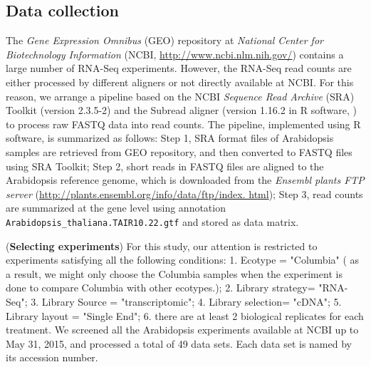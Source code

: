 \documentclass[11pt, a4paper]{article}
\begin{document}
\subsection{Data collection}\label{section:DataCollection}
The \textit{Gene Expression Omnibus} (GEO) repository at \textit{National Center for Biotechnology Information} (NCBI, \url{http://www.ncbi.nlm.nih.gov/}) contains a large number of RNA-Seq experiments. However, the RNA-Seq read counts are either processed by different aligners or not directly available at NCBI. For this reason, we arrange a pipeline based on the NCBI \textit{Sequence Read Archive} (SRA) Toolkit (version 2.3.5-2) and the Subread aligner (version 1.16.2 in R software, \cite{liao2013subread}) to process raw FASTQ data into read counts. The pipeline, implemented using R software, is summarized as follows: Step 1,  SRA format files of Arabidopsis samples are retrieved from GEO repository, and then converted to FASTQ files using SRA Toolkit;  %
Step 2, short reads in FASTQ files are aligned to the Arabidopsis reference genome, which is downloaded from the\textit{ Ensembl plants FTP server} (\url{http://plants.ensembl.org/info/data/ftp/index. html});
Step 3, read counts are summarized at the gene level using annotation \verb"Arabidopsis_thaliana.TAIR10.22.gtf" and stored as data matrix. %


  (\textbf{Selecting experiments}) For this study, our attention is restricted to experiments satisfying all the following conditions:  1. Ecotype = "Columbia" ( as a result, we might only choose the Columbia samples when the experiment is done to compare Columbia with other ecotypes.); 2. Library strategy= "RNA-Seq"; 3. Library Source = "transcriptomic"; 4. Library selection= "cDNA"; 5. Library layout = "Single End"; 6. there are at least 2 biological replicates for each treatment. We screened all the Arabidopsis experiments available at NCBI up to May 31, 2015, and processed a total of 49 data sets. Each data set is named by its accession number. 
    
\end{document}
